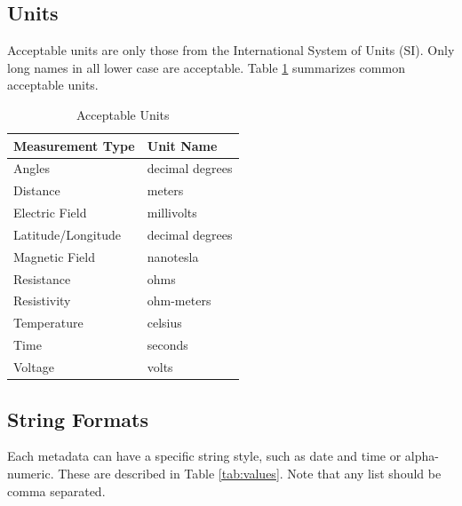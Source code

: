 \documentclass[12pt]{article}
\begin{document}
\subsection{Units}
Acceptable units are only those from the International System of Units (SI).  Only long names in all lower case are acceptable.  Table \ref{tab:units} summarizes common acceptable units.


\begin{table}[!h]
	\centering
	\caption[Acceptable Units]{Acceptable Units}
	\begin{tabular}{ll}
		\toprule
		\textbf{Measurement Type} & \textbf{Unit Name} \\ \midrule
		Angles & decimal degrees \\ \midrule
		
		Distance &  meters  \\ \midrule
		Electric Field & millivolts\\ \midrule
		Latitude/Longitude & decimal degrees \\ \midrule
		Magnetic Field & nanotesla \\ \midrule
		Resistance & ohms   \\ \midrule
		Resistivity & ohm-meters \\ \midrule
		Temperature & celsius\\ \midrule
		Time & seconds\\ \midrule
		Voltage & volts \\ \bottomrule
		
		
	\end{tabular}
	\label{tab:units}
\end{table}

\subsection{String Formats}

Each metadata can have a specific string style, such as date and time or alpha-numeric.  These are described in Table \ref{tab:values}.  Note that any list should be comma separated.
\end{document}
